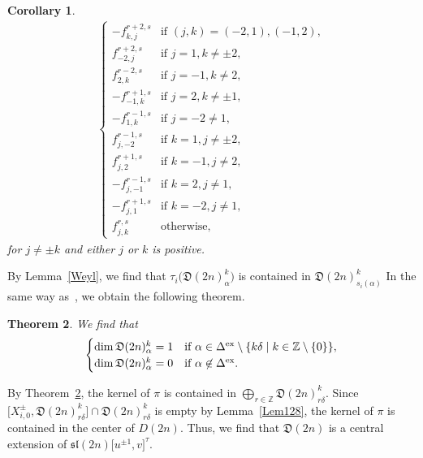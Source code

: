 \documentclass[10pt,a4paper]{amsart}
\numberwithin{equation}{section}
\newtheorem{Theorem}{Theorem}[section]
\newtheorem{Corollary}[Theorem]{Corollary}
\theoremstyle{definition}
\begin{document}
\begin{Corollary}
{\begin{align*}
\begin{cases}
-f_{k,j}^{r+2,s}&\text{if }(j,k)=(-2,1),(-1,2),\\
f_{-2,j}^{r+2,s}&\text{if }j=1,k\neq\pm 2,\\
f_{2,k}^{r-2,s}&\text{if }j=-1,k\neq 2,\\
-f_{-1,k}^{r+1,s}&\text{if }j=2,k\neq \pm 1,\\
-f_{1,k}^{r-1,s}&\text{if }j=-2\neq 1,\\
f_{j,-2}^{r-1,s}&\text{if }k=1,j\neq\pm 2,\\
f_{j,2}^{r+1,s}&\text{if }k=-1,j\neq 2,\\
-f_{j,-1}^{r-1,s}&\text{if }k=2,j\neq 1,\\
-f_{j,1}^{r+1,s}&\text{if }k=-2,j\neq 1,\\
f_{j,k}^{r,s}&\text{otherwise},
\end{cases}
\end{align*}
for $j\neq \pm k$ and either $j$ or $k$ is positive.}
\end{Corollary}

By Lemma~\ref{Weyl}, we find that $\tau_i\bigl(\mathfrak{D}(2n)_\alpha^k\bigr)$ is contained in $\mathfrak{D}(2n)_{s_i(\alpha)}^k$
In the same way as~\cite[Proposition~3.2]{MRY}, we obtain the following theorem.
\begin{Theorem}\label{Thm128}
We find that
\[\begin{cases}
\dim \mathfrak{D}(2n)_\alpha^k=1&\text{if }\alpha\in\Delta^{{\rm ex}}\setminus\{k\delta\mid k\in\mathbb{Z}\setminus\{0\}\},\\
\dim \mathfrak{D}(2n)_\alpha^k=0&\text{if }\alpha\not\in\Delta^{{\rm ex}}.
\end{cases}
\]
\end{Theorem}
By Theorem~\ref{Thm128}, the kernel of $\pi$ is contained in $\bigoplus_{r\in\mathbb{Z}} \mathfrak{D}(2n)_{r\delta}^k$. Since $\bigl[X^\pm_{i,0},\mathfrak{D}(2n)_{r\delta}^k\bigr]\cap \mathfrak{D}(2n)_{r\delta}^k$ is empty by Lemma~\ref{Lem128}, the kernel of $\pi$ is contained in the center of $D(2n)$.
Thus, we find that $\mathfrak{D}(2n)$ is a central extension of $\mathfrak{sl}(2n)\bigl[u^{\pm1},v\bigr]^\tau$.
\end{document}
